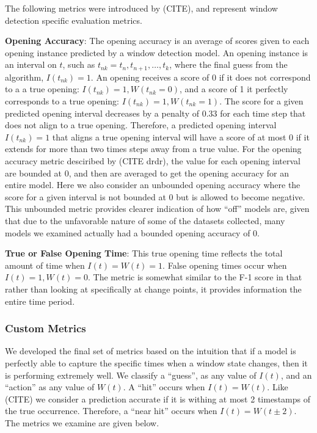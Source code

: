 \documentclass[sigconf]{acmart}
\begin{document}
The following metrics were introduced by (CITE), and represent window
detection specific evaluation metrics.

\textbf{Opening Accuracy}: The opening accuracy is an average of scores
given to each opening instance predicted by a window detection model. An
opening instance is an interval on \(t\), such as
\(t_{nk} = t_n, t_{n+1}, \dots , t_k\), where the final guess from the
algorithm, \(I(t_{nk}) = 1\). An opening receives a score of 0 if it
does not correspond to a a true opening:
\(I(t_{nk}) = 1, W(t_{nk} = 0)\), and a score of 1 it perfectly
corresponds to a true opening: \(I(t_{nk}) = 1, W(t_{nk} = 1)\). The
score for a given predicted opening interval decreases by a penalty of
0.33 for each time step that does not align to a true opening.
Therefore, a predicted opening interval \(I(t_{nk}) = 1\) that aligns a
true opening interval will have a score of at most 0 if it extends for
more than two times steps away from a true value. For the opening
accuracy metric desciribed by (CITE drdr), the value for each opening
interval are bounded at 0, and then are averaged to get the opening
accuracy for an entire model. Here we also consider an unbounded opening
accuracy where the score for a given interval is not bounded at 0 but is
allowed to become negative. This unbounded metric provides clearer
indication of how ``off'' models are, given that due to the unfavorable
nature of some of the datasets collected, many models we examined
actually had a bounded opening accuracy of 0.

\textbf{True or False Opening Time}: This true opening time reflects the
total amount of time when \(I(t) = W(t) = 1\). False opening times occur
when \(I(t) = 1, W(t) = 0\). The metric is somewhat similar to the F-1
score in that rather than looking at specifically at change points, it
provides information the entire time period.

\hypertarget{custom-metrics}{%
\subsubsection{Custom Metrics}\label{custom-metrics}}

We developed the final set of metrics based on the intuition that if a
model is perfectly able to capture the specific times when a window
state changes, then it is performing extremely well. We classify a
``guess'', as any value of \(I(t)\), and an ``action'' as any value of
\(W(t)\). A ``hit'' occurs when \(I(t) = W(t)\). Like (CITE) we consider
a prediction accurate if it is withing at most 2 timestamps of the true
occurrence. Therefore, a ``near hit'' occurs when \(I(t) = W(t \pm 2)\).
The metrics we examine are given below.
\end{document}
